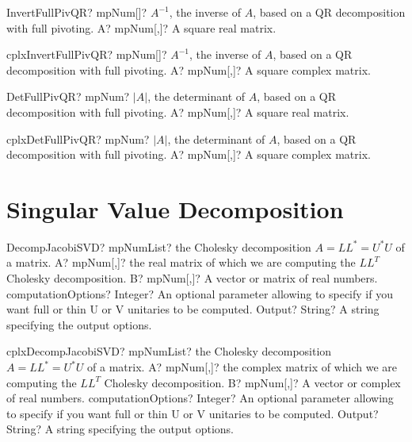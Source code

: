 \documentclass[12pt,a4paper,openany]{book}
\begin{document}
\begin{mpFunctionsExtract}
\mpFunctionOne
{InvertFullPivQR? mpNum[]? $A^{-1}$, the inverse of $A$, based on a QR decomposition with full pivoting.}
{A? mpNum[,]? A square real matrix.}
\end{mpFunctionsExtract}

\begin{mpFunctionsExtract}
\mpFunctionOne
{cplxInvertFullPivQR? mpNum[]? $A^{-1}$, the inverse of $A$, based on a QR decomposition with full pivoting.}
{A? mpNum[,]? A square complex matrix.}
\end{mpFunctionsExtract}

\begin{mpFunctionsExtract}
\mpFunctionOne
{DetFullPivQR? mpNum? $|A|$, the determinant of $A$, based on a QR decomposition with full pivoting.}
{A? mpNum[,]? A square real matrix.}
\end{mpFunctionsExtract}

\begin{mpFunctionsExtract}
\mpFunctionOne
{cplxDetFullPivQR? mpNum? $|A|$, the determinant of $A$, based on a QR decomposition with full pivoting.}
{A? mpNum[,]? A square complex matrix.}
\end{mpFunctionsExtract}

\section{Singular Value Decomposition}

\begin{mpFunctionsExtract}
\mpFunctionFour
{DecompJacobiSVD? mpNumList? the Cholesky decomposition $A = LL^* = U^*U$ of a matrix.}
{A? mpNum[,]? the real matrix of which we are computing the $LL^T$ Cholesky decomposition.}
{B? mpNum[,]? A vector or matrix of real numbers.}
{computationOptions? Integer? An optional parameter allowing to specify if you want full or thin U or V unitaries to be computed.}
{Output? String? A string specifying the output options.}
\end{mpFunctionsExtract}

\begin{mpFunctionsExtract}
\mpFunctionFour
{cplxDecompJacobiSVD? mpNumList? the Cholesky decomposition $A = LL^* = U^*U$ of a matrix.}
{A? mpNum[,]? the complex matrix of which we are computing the $LL^T$ Cholesky decomposition.}
{B? mpNum[,]? A vector or complex of real numbers.}
{computationOptions? Integer? An optional parameter allowing to specify if you want full or thin U or V unitaries to be computed.}
{Output? String? A string specifying the output options.}
\end{mpFunctionsExtract}
\end{document}
